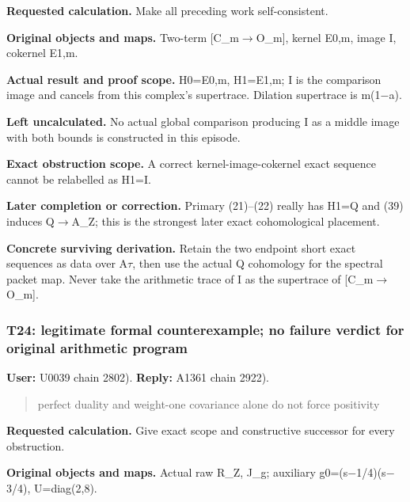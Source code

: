 \textbf{Requested calculation.} Make all preceding work self-consistent.

\textbf{Original objects and maps.} Two-term
[C\_m\allowbreak{}\ensuremath{→}\allowbreak{}O\_m], kernel E0,m, image
I, cokernel E1,m.

\textbf{Actual result and proof scope.} H0=E0,m, H1=E1,m; I is the
comparison image and cancels from this complex's supertrace. Dilation
supertrace is m(1\allowbreak{}\ensuremath{−}\allowbreak{}a).

\textbf{Left uncalculated.} No actual global comparison producing I as a
middle image with both bounds is constructed in this episode.

\textbf{Exact obstruction scope.} A correct kernel-image-cokernel exact
sequence cannot be relabelled as H1=I.

\textbf{Later completion or correction.} Primary (21)--(22) really has
H1=Q and (39) induces Q\allowbreak{}\ensuremath{→}\allowbreak{}A\_Z;
this is the strongest later exact cohomological placement.

\textbf{Concrete surviving derivation.} Retain the two endpoint short
exact sequences as data over A\allowbreak{}\ensuremath{τ}\allowbreak{},
then use the actual Q cohomology for the spectral packet map. Never take
the arithmetic trace of I as the supertrace of
[C\_m\allowbreak{}\ensuremath{→}\allowbreak{}O\_m].

\subsubsection{T24: legitimate formal counterexample; no failure verdict
for original arithmetic
program}\label{TranscriptLedgerStage:t24-legitimate-formal-counterexample-no-failure-verdict-for-original-arithmetic-program}

\textbf{User:} U0039
\protect{} chain 2802).
\textbf{Reply:} A1361
\protect{} chain 2922).

\begin{quote}
perfect duality and weight-one covariance alone do not force positivity
\end{quote}

\textbf{Requested calculation.} Give exact scope and constructive
successor for every obstruction.

\textbf{Original objects and maps.} Actual raw R\_Z, J\_g; auxiliary
g0=(s\allowbreak{}\ensuremath{−}\allowbreak{}1/4)(s\allowbreak{}\ensuremath{−}\allowbreak{}3/4),
U=diag(2,8).

